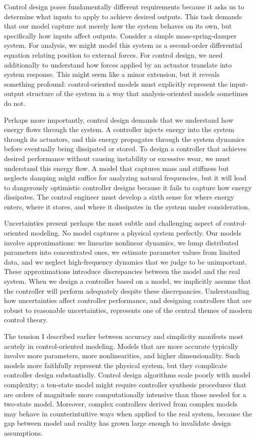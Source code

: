Control design poses fundamentally different requirements because it asks us to determine what inputs to apply to achieve desired outputs. This task demands that our model capture not merely how the system behaves on its own, but specifically how inputs affect outputs. Consider a simple mass-spring-damper system. For analysis, we might model this system as a second-order differential equation relating position to external forces. For control design, we need additionally to understand how forces applied by an actuator translate into system response. This might seem like a minor extension, but it reveals something profound: control-oriented models must explicitly represent the input-output structure of the system in a way that analysis-oriented models sometimes do not.

Perhaps more importantly, control design demands that we understand how energy flows through the system. A controller injects energy into the system through its actuators, and this energy propagates through the system dynamics before eventually being dissipated or stored. To design a controller that achieves desired performance without causing instability or excessive wear, we must understand this energy flow. A model that captures mass and stiffness but neglects damping might suffice for analyzing natural frequencies, but it will lead to dangerously optimistic controller designs because it fails to capture how energy dissipates. The control engineer must develop a sixth sense for where energy enters, where it stores, and where it dissipates in the system under consideration.

Uncertainties present perhaps the most subtle and challenging aspect of control-oriented modeling. No model captures a physical system perfectly. Our models involve approximations: we linearize nonlinear dynamics, we lump distributed parameters into concentrated ones, we estimate parameter values from limited data, and we neglect high-frequency dynamics that we judge to be unimportant. These approximations introduce discrepancies between the model and the real system. When we design a controller based on a model, we implicitly assume that the controller will perform adequately despite these discrepancies. Understanding how uncertainties affect controller performance, and designing controllers that are robust to reasonable uncertainties, represents one of the central themes of modern control theory.

The tension I described earlier between accuracy and simplicity manifests most acutely in control-oriented modeling. Models that are more accurate typically involve more parameters, more nonlinearities, and higher dimensionality. Such models more faithfully represent the physical system, but they complicate controller design substantially. Control design algorithms scale poorly with model complexity; a ten-state model might require controller synthesis procedures that are orders of magnitude more computationally intensive than those needed for a two-state model. Moreover, complex controllers derived from complex models may behave in counterintuitive ways when applied to the real system, because the gap between model and reality has grown large enough to invalidate design assumptions.


